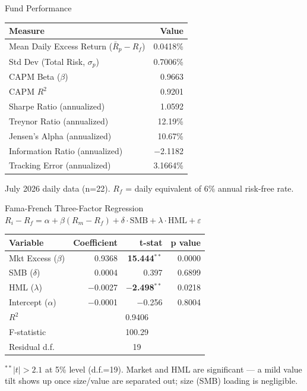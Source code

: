 \documentclass[11pt, aspectratio=43]{beamer}
\begin{document}
\begin{frame}{Fund Performance}
\centering
\small
\begin{tabular}{l r}
\toprule
\textbf{Measure} & \textbf{Value} \\
\midrule
Mean Daily Excess Return ($\bar{R}_p - R_f$) & 0.0418\% \\
Std Dev (Total Risk, $\sigma_p$) & 0.7006\% \\
CAPM Beta ($\beta$) & 0.9663 \\
CAPM $R^2$ & 0.9201 \\
\midrule
Sharpe Ratio (annualized) & 1.0592 \\
Treynor Ratio (annualized) & 12.19\% \\
Jensen's Alpha (annualized) & 10.67\% \\
Information Ratio (annualized) & $-$2.1182 \\
Tracking Error (annualized) & 3.1664\% \\
\bottomrule
\end{tabular}

\vspace{0.5em}
\footnotesize
July 2026 daily data (n=22). $R_f$ = daily equivalent of 6\% annual risk-free rate.
\end{frame}


\begin{frame}{Fama-French Three-Factor Regression}
\centering
\small
$R_i - R_f = \alpha + \beta(R_m - R_f) + \delta \cdot \text{SMB} + \lambda \cdot \text{HML} + \varepsilon$

\vspace{0.5em}
\begin{tabular}{l r r r}
\toprule
\textbf{Variable} & \textbf{Coefficient} & \textbf{t-stat} & \textbf{p value} \\
\midrule
Mkt Excess ($\beta$) & 0.9368 & \textbf{15.444}$^{**}$ & 0.0000 \\
SMB ($\delta$) & 0.0004 & 0.397 & 0.6899\\
HML ($\lambda$) & $-$0.0027 & \textbf{$-$2.498}$^{**}$ & 0.0218\\
Intercept ($\alpha$) & $-$0.0001 & $-$0.256 & 0.8004 \\
\midrule
$R^2$ & \multicolumn{3}{c}{0.9406} \\
F-statistic & \multicolumn{3}{c}{100.29} \\
Residual d.f. & \multicolumn{3}{c}{19} \\
\bottomrule
\end{tabular}

\vspace{0.5em}
\footnotesize
$^{**}|t|>2.1$ at 5\% level (d.f.=19). Market and HML are significant --- a mild
value tilt shows up once size/value are separated out; size (SMB) loading is
negligible.
\end{frame}
\end{document}
